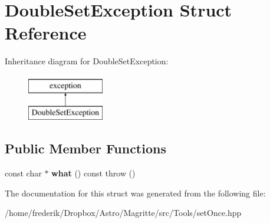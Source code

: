\hypertarget{structDoubleSetException}{}\section{Double\+Set\+Exception Struct Reference}
\label{structDoubleSetException}
Inheritance diagram for Double\+Set\+Exception\+:\begin{figure}[H]
\begin{center}
\leavevmode
\includegraphics[height=2.000000cm]{structDoubleSetException}
\end{center}
\end{figure}
\subsection*{Public Member Functions}
\begin{DoxyCompactItemize}
\item 
\mbox{\label{structDoubleSetException_a2568d6f42bcc8fb68ff83893eb4221b0}} 
const char $\ast$ {\bfseries what} () const  throw ()
\end{DoxyCompactItemize}


The documentation for this struct was generated from the following file\+:\begin{DoxyCompactItemize}
\item 
/home/frederik/\+Dropbox/\+Astro/\+Magritte/src/\+Tools/set\+Once.\+hpp\end{DoxyCompactItemize}
